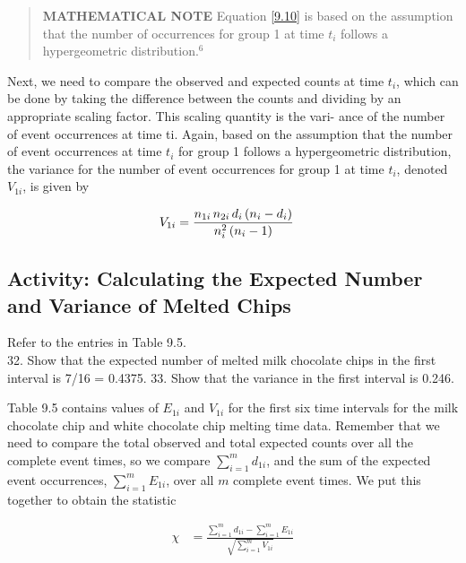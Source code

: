 \documentclass[
]{book}
\begin{document}
\begin{quote}
\textbf{MATHEMATICAL NOTE} Equation \ref{9.10} is based on the assumption that the number of occurrences for group 1 at time \(t_i\) follows a hypergeometric distribution.\(^6\)
\end{quote}

Next, we need to compare the observed and expected counts at time \(t_i\), which can be done by taking the
difference between the counts and dividing by an appropriate scaling factor. This scaling quantity is the vari-
ance of the number of event occurrences at time ti. Again, based on the assumption that the number of event
occurrences at time \(t_i\) for group 1 follows a hypergeometric distribution, the variance for the number of event
occurrences for group 1 at time \(t_i\), denoted \(V_{1i}\), is given by

\begin{align}
V_{1i} &= \frac{n_{1i}\,n_{2i}\,d_i\,(n_i - d_i)}{n_i^2\,(n_i - 1)}
\notag
\end{align}

\hypertarget{activity-calculating-the-expected-number-and-variance-of-melted-chips}{%
\subsection*{Activity: Calculating the Expected Number and Variance of Melted Chips}\label{activity-calculating-the-expected-number-and-variance-of-melted-chips}}

Refer to the entries in Table 9.5.\\
32. Show that the expected number of melted milk chocolate chips in the first interval is 7/16 = 0.4375.
33. Show that the variance in the first interval is 0.246.

Table 9.5 contains values of \(E_{1i}\) and \(V_{1i}\) for the first six time intervals for the milk chocolate chip and white chocolate chip melting time data. Remember that we need to compare the total observed and total expected counts over all the complete event times, so we compare \(\sum_{i=1}^m d_{1i}\), and the sum of the expected event occurrences, \(\sum_{i=1}^m E_{1i}\), over all \(m\) complete event times. We put this together to obtain the statistic

\begin{align}\label{9.11}
\chi &= \frac{\sum_{i=1}^m d_{1i} - \sum_{i=1}^m E_{1i}}{\sqrt{\sum_{i=1}^m V_{1i}}}
\tag{9.11}
\end{align}
\end{document}
